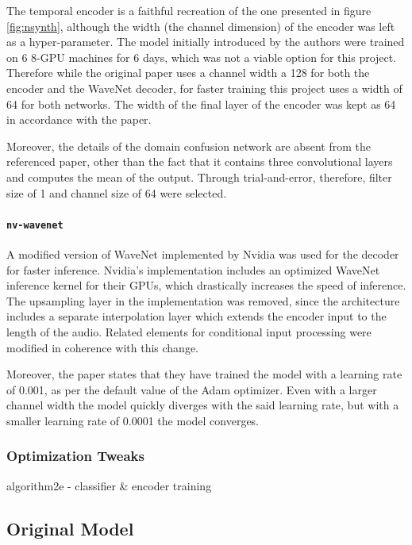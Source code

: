 \documentclass[]{report}
\begin{document}
The temporal encoder is a faithful recreation of the one presented in
figure \ref{fig:nsynth}, although the width (the channel dimension) of
the encoder was left as a hyper-parameter. The model initially
introduced by the authors were trained on 6 8-GPU machines for 6 days,
which was not a viable option for this project. Therefore while the
original paper uses a channel width a 128 for both the encoder and the
WaveNet decoder, for faster training this project uses a width of 64 for
both networks. The width of the final layer of the encoder was kept as
64 in accordance with the paper.

Moreover, the details of the domain confusion network are absent from
the referenced paper, other than the fact that it contains three
convolutional layers and computes the mean of the output. Through
trial-and-error, therefore, filter size of 1 and channel size of 64 were
selected.

\paragraph{\texttt{nv-wavenet}}

A modified version of WaveNet implemented by Nvidia was used for the
decoder for faster inference. Nvidia's implementation includes an
optimized WaveNet inference kernel for their GPUs, which drastically
increases the speed of inference. The upsampling layer in the
implementation was removed, since the architecture includes a separate
interpolation layer which extends the encoder input to the length of the
audio. Related elements for conditional input processing were modified
in coherence with this change.

Moreover, the paper states that they have trained the model with a
learning rate of 0.001, as per the default value of the Adam optimizer.
Even with a larger channel width the model quickly diverges with the
said learning rate, but with a smaller learning rate of 0.0001 the model
converges.

\hypertarget{optimization-tweaks}{%
\subsubsection{Optimization Tweaks}\label{optimization-tweaks}}

algorithm2e - classifier \& encoder training

\hypertarget{original-model}{%
\subsection{Original Model}\label{original-model}}
\end{document}
